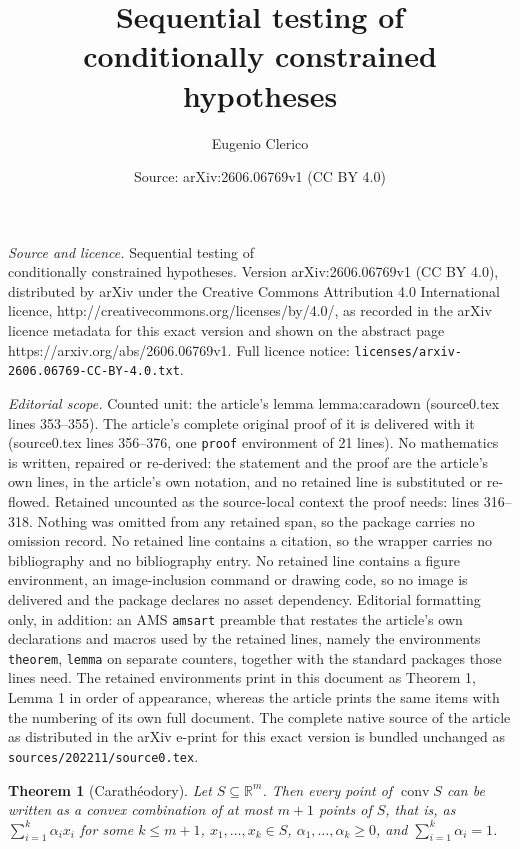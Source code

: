\documentclass[10pt,a4paper]{amsart}
\title{Sequential testing of\\ conditionally constrained hypotheses}
\author{Eugenio Clerico}
\date{Source: arXiv:2606.06769v1 (CC BY 4.0)}
\newtheorem{theorem}{Theorem}
\newcommand{\R}{\mathbb R}
\DeclareMathOperator{\conv}{conv}
\begin{document}
\maketitle

\noindent\emph{Source and licence.} Sequential testing of\\ conditionally constrained hypotheses. Version arXiv:2606.06769v1 (CC BY 4.0), distributed by arXiv under the Creative Commons Attribution 4.0 International licence, http://creativecommons.org/licenses/by/4.0/, as recorded in the arXiv licence metadata for this exact version and shown on the abstract page https://arxiv.org/abs/2606.06769v1. Full licence notice: \texttt{licenses/arxiv-2606.06769-CC-BY-4.0.txt}.\par\smallskip

\noindent\textit{Editorial scope.} Counted unit: the article's lemma lemma:caradown (source0.tex lines 353--355). The article's complete original proof of it is delivered with it (source0.tex lines 356--376, one \texttt{proof} environment of 21 lines). No mathematics is written, repaired or re-derived: the statement and the proof are the article's own lines, in the article's own notation, and no retained line is substituted or re-flowed.  Retained uncounted as the source-local context the proof needs: lines 316--318.  Nothing was omitted from any retained span, so the package carries no omission record.  No retained line contains a citation, so the wrapper carries no bibliography and no bibliography entry.  No retained line contains a figure environment, an image-inclusion command or drawing code, so no image is delivered and the package declares no asset dependency.  Editorial formatting only, in addition: an AMS \texttt{amsart} preamble that restates the article's own declarations and macros used by the retained lines, namely the environments \texttt{theorem}, \texttt{lemma} on separate counters, together with the standard packages those lines need.  The retained environments print in this document as Theorem 1, Lemma 1 in order of appearance, whereas the article prints the same items with the numbering of its own full document.  The complete native source of the article as distributed in the arXiv e-print for this exact version is bundled unchanged as \texttt{sources/202211/source0.tex}.
\begin{theorem}[Carathéodory]\label{thm:caratheodory}
    Let $S\subseteq\R^m$. Then every point of $\conv S$ can be written as a convex combination of at most $m+1$ points of $S$, that is, as $\sum_{i=1}^k \alpha_i x_i$ for some $k\leq m+1$, $x_1,\dots,x_k\in S$, $\alpha_1,\dots,\alpha_k\geq 0$, and $\sum_{i=1}^k \alpha_i=1$.
\end{theorem}
\end{document}
